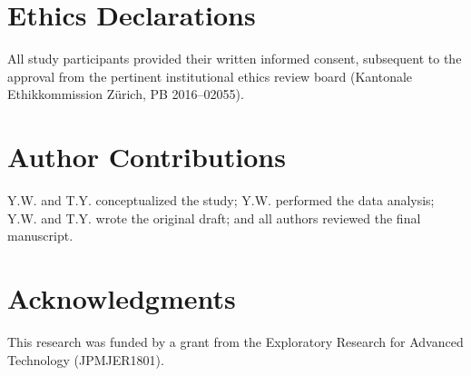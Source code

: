 \documentclass[preprint,review,12pt]{elsarticle}%
\begin{document}





% 

% 




\section*{Ethics Declarations}
All study participants provided their written informed consent, subsequent to the approval from the pertinent institutional ethics review board (Kantonale Ethikkommission Zürich, PB 2016–02055).  
\label{ethics declarations}

\section*{Author Contributions}
Y.W. and T.Y. conceptualized the study; Y.W. performed the data analysis; Y.W. and T.Y. wrote the original draft; and all authors reviewed the final manuscript.
\label{author contributions}

\section*{Acknowledgments}
This research was funded by a grant from the Exploratory Research for Advanced Technology (JPMJER1801).
\label{acknowledgments}

\end{document}
